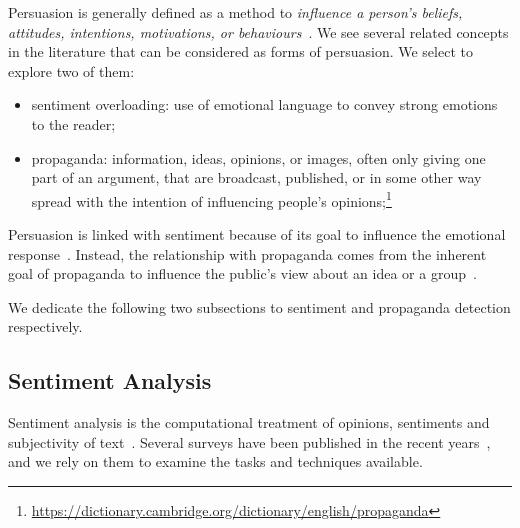Persuasion is generally defined as a method to \emph{influence a person's beliefs, attitudes, intentions, motivations, or behaviours}~\cite{gass2018persuasion}.
We see several related concepts in the literature that can be considered as forms of persuasion. We select to explore two of them:
\begin{itemize}
    \item sentiment overloading: use of emotional language to convey strong emotions to the reader; %
    \item \gls{propaganda}:  information, ideas, opinions, or images, often only giving one part of an argument, that are broadcast, published, or in some other way spread with the intention of influencing people's opinions;\footnote{\url{https://dictionary.cambridge.org/dictionary/english/propaganda}} %
\end{itemize}

Persuasion is linked with sentiment because of its goal to influence the emotional response~\citep{gatti2014sentiment,rocklage2018persuasion,petty2015emotion,desteno2004discrete}.
Instead, the relationship with propaganda comes from the inherent goal of propaganda to influence the public's view about an idea or a group~\citep{bernays,jowett2018propaganda}.

We dedicate the following two subsections to sentiment and propaganda detection respectively.

\subsection{\statusgreen Sentiment Analysis}
\label{sec:lit_sentiment}


Sentiment analysis is the computational treatment of opinions, sentiments and subjectivity of text~\citep{medhat2014sentiment}.
Several surveys have been published in the recent years~\citep{liu2010sentiment,medhat2014sentiment,wankhade2022survey}, and we rely on them to examine the tasks and techniques available.


